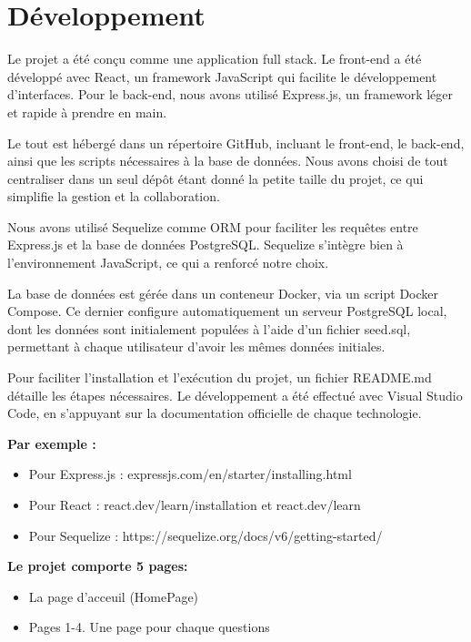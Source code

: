 \documentclass{article}
\begin{document}
\section{Développement}
Le projet a été conçu comme une application full stack. Le front-end a été développé avec React, un framework JavaScript qui facilite le développement d'interfaces. Pour le back-end, nous avons utilisé Express.js, un framework léger et rapide à prendre en main.

Le tout est hébergé dans un répertoire GitHub, incluant le front-end, le back-end, ainsi que les scripts nécessaires à la base de données. Nous avons choisi de tout centraliser dans un seul dépôt étant donné la petite taille du projet, ce qui simplifie la gestion et la collaboration.

Nous avons utilisé Sequelize comme ORM pour faciliter les requêtes entre Express.js et la base de données PostgreSQL. Sequelize s’intègre bien à l’environnement JavaScript, ce qui a renforcé notre choix.

La base de données est gérée dans un conteneur Docker, via un script Docker Compose. Ce dernier configure automatiquement un serveur PostgreSQL local, dont les données sont initialement populées à l’aide d’un fichier seed.sql, permettant à chaque utilisateur d’avoir les mêmes données initiales.

Pour faciliter l’installation et l'exécution du projet, un fichier README.md détaille les étapes nécessaires. Le développement a été effectué avec Visual Studio Code, en s’appuyant sur la documentation officielle de chaque technologie.

\textbf{Par exemple :}
\begin{itemize}
    \item Pour Express.js : expressjs.com/en/starter/installing.html
    \item Pour React : react.dev/learn/installation et react.dev/learn
    \item Pour Sequelize : https://sequelize.org/docs/v6/getting-started/
\end{itemize}


\textbf{Le projet comporte 5 pages:}
\begin{itemize}
    \item La page d'acceuil (HomePage)
    \item Pages 1-4. Une page pour chaque questions
\end{itemize}
\end{document}
